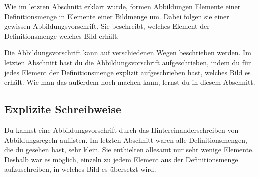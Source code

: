 \documentclass[../../main.tex]{subfiles}
\begin{document}
\label{sec:abbildungen_explizite_schreibweise}
Wie im letzten Abschnitt erklärt wurde, formen Abbildungen Elemente einer Definitionsmenge in Elemente einer Bildmenge um. Dabei folgen sie einer gewissen Abbildungsvorschrift. Sie beschreibt, welches Element der Definitionsmenge welches Bild erhält.

Die Abbildungsvorschrift kann auf verschiedenen Wegen beschrieben werden. Im letzten Abschnitt hast du die Abbildungsvorschrift aufgeschrieben, indem du für jedes Element der Definitionsmenge explizit aufgeschrieben hast, welches Bild es erhält. Wie man das außerdem noch machen kann, lernst du in diesem Abschnitt.

\subsection{Explizite Schreibweise}

Du kannst eine Abbildungsvorschrift durch das Hintereinanderschreiben von Abbildungsregeln auflisten. Im letzten Abschnitt waren alle Definitionsmengen, die du gesehen hast, sehr klein. Sie enthielten allesamt nur sehr wenige Elemente. Deshalb war es möglich, einzeln zu jedem Element aus der Definitionsmenge aufzuschreiben, in welches Bild es übersetzt wird.
\end{document}
